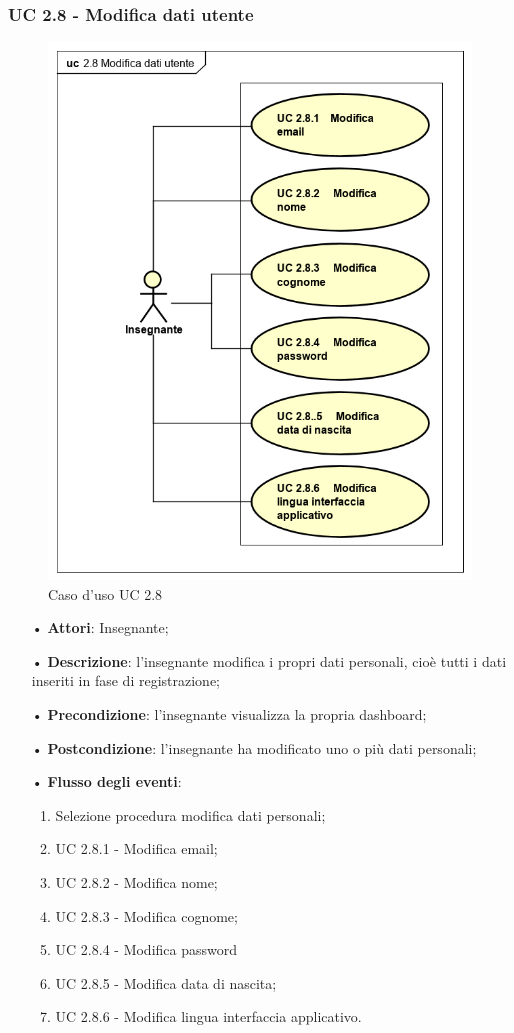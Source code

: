 \subsubsection{UC 2.8 - Modifica dati utente}
\begin{figure}[H]
\centering
\includegraphics[width=12cm, keepaspectratio]{img/modificadatiutenteinsegnante1.png} 
\caption{Caso d'uso UC 2.8}
\end{figure}

\begin{itemize}
	\item[•] \textbf{Attori}: Insegnante;
	\item[•] \textbf{Descrizione}: l'insegnante modifica i propri dati personali, cioè tutti i dati inseriti in fase di registrazione;
	\item[•] \textbf{Precondizione}: l'insegnante visualizza la propria dashboard;
	\item[•] \textbf{Postcondizione}: l'insegnante ha modificato uno o più dati personali;
	\item[•] \textbf{Flusso degli eventi}:
	\begin{enumerate}
		\item Selezione procedura modifica dati personali;
		\item UC 2.8.1 - Modifica email;
		\item UC 2.8.2 - Modifica nome;
		\item UC 2.8.3 - Modifica cognome;
		\item UC 2.8.4 - Modifica password
		\item UC 2.8.5 - Modifica data di nascita;
		\item UC 2.8.6 - Modifica lingua interfaccia applicativo.
	\end{enumerate}
\end{itemize}

